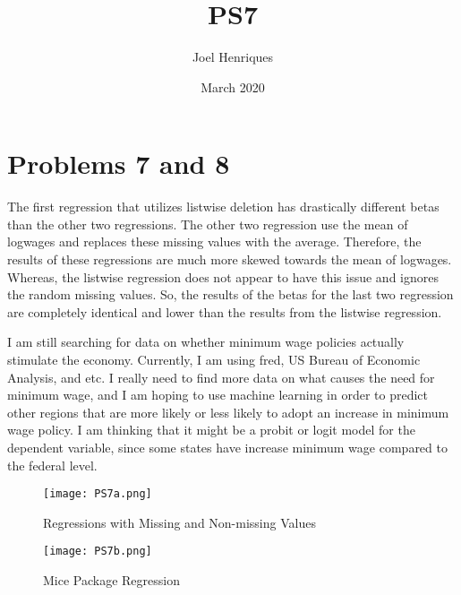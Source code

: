 \documentclass{article}
\title{PS7}
\author{Joel Henriques}
\date{March 2020}
\begin{document}
\maketitle

\section{Problems 7 and 8}
\item The first regression that utilizes listwise deletion has drastically different betas than the other two regressions. The other two regression use the mean of logwages and replaces these missing values with the average. Therefore, the results of these regressions are much more skewed towards the mean of logwages. Whereas, the listwise regression does not appear to have this issue and ignores the random missing values. So, the results of the betas for the last two regression are completely identical and lower than the results from the listwise regression. 
\item I am still searching for data on whether minimum wage policies actually stimulate the economy. Currently, I am using fred, US Bureau of Economic Analysis, and etc. I really need to find more data on what causes the need for minimum wage, and I am hoping to use machine learning in order to predict other regions that are more likely or less likely to adopt an increase in minimum wage policy. I am thinking that it might be a probit or logit model for the dependent variable, since some states have increase minimum wage compared to the federal level. 


\begin{figure}[h!]
\centering
\texttt{[image: PS7a.png]}
\caption{Regressions with Missing and Non-missing Values}
\label{fig: Regressions with Missing and Nonmissing Values}


\centering
\texttt{[image: PS7b.png]}
\caption{Mice Package Regression}
\label{fig:universe}
\end{figure}
\end{document}
